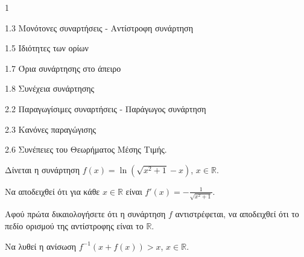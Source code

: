 \begin{ylh}{1}
    \item 1.3 Μονότονες συναρτήσεις - Αντίστροφη συνάρτηση
    \item 1.5 Ιδιότητες των ορίων
    \item 1.7 Όρια συνάρτησης στο άπειρο
    \item 1.8 Συνέχεια συνάρτησης
    \item 2.2 Παραγωγίσιμες συναρτήσεις - Παράγωγος συνάρτηση
    \item 2.3 Κανόνες παραγώγισης
    \item 2.6 Συνέπειες του Θεωρήματος Μέσης Τιμής.
\end{ylh}
Δίνεται η συνάρτηση $f(x)=\ln(\sqrt{x^2+1}-x)$, $x \in \mathbb{R}$.
\begin{alist}
\item Να αποδειχθεί ότι για κάθε $x \in \mathbb{R}$ είναι $f'(x)=-\frac{1}{\sqrt{x^2+1}}$. 
\item Αφού πρώτα δικαιολογήσετε ότι η συνάρτηση $f$ αντιστρέφεται, να αποδειχθεί ότι το πεδίο ορισμού της αντίστροφης είναι το $\mathbb{R}$. 
\item Να λυθεί η ανίσωση $f^{-1}(x+f(x))>x$, $x \in \mathbb{R}$. 
\end{alist}